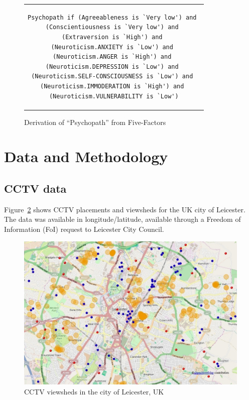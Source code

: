 \documentclass[conference]{IEEEtran}
\begin{document}
\begin{figure}[!htp]
\centering
\begin{tabular}{c}
\begin{lstlisting}[breaklines=true,basicstyle=\ttfamily\scriptsize,emphstyle=\bfseries,] 
Psychopath if (Agreeableness is `Very low') and 
(Conscientiousness is `Very low') and 
(Extraversion is `High') and 
(Neuroticism.ANXIETY is `Low') and 
(Neuroticism.ANGER is `High') and 
(Neuroticism.DEPRESSION is `Low') and 
(Neuroticism.SELF-CONSCIOUSNESS is `Low') and 
(Neuroticism.IMMODERATION is `High') and 
(Neuroticism.VULNERABILITY is `Low')
\end{lstlisting}
\end{tabular}
\caption{Derivation of ``Psychopath'' from Five-Factors}
\label{psychopath}
\end{figure}


\section{Data and Methodology}\label{data+method}

\subsection{CCTV data}

Figure~\ref{fig:viewsheds} shows CCTV placements and viewsheds for the
UK city of Leicester. The data was available in longitude/latitude,
available through a Freedom of Information (FoI) request to Leicester City
Council.

\begin{figure}[!htp]
\centering
\includegraphics[width=\columnwidth]{images/viewsheds.jpg}
\caption{ CCTV viewsheds in the city of Leicester, UK}
\label{fig:viewsheds}
\end{figure} 
\end{document}
